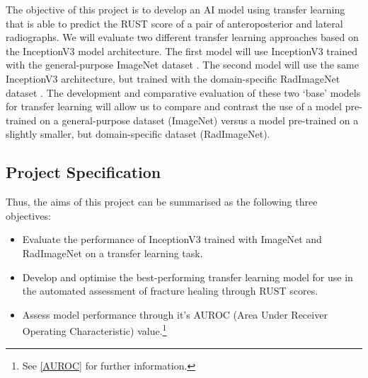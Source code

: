 The objective of this project is to develop an AI model using transfer learning that is able to predict the RUST score of a pair of anteroposterior and lateral radiographs. We will evaluate two different transfer learning approaches based on the InceptionV3 model architecture\autocite{inceptionv3}.
The first model will use InceptionV3 trained with the general-purpose ImageNet dataset \autocite{imagenet}.
The second model will use the same InceptionV3 architecture, but trained with the domain-specific RadImageNet dataset \autocite{radimagenet}. The development and comparative evaluation of these two \enquote*{base} models for transfer learning will allow us to compare and contrast the use of a model pre-trained on a general-purpose dataset (ImageNet) versus a model pre-trained on a slightly smaller, but domain-specific dataset (RadImageNet).

\clearpage
\subsection{Project Specification}

Thus, the aims of this project can be summarised as the following three objectives:

\begin{itemize}
    \item Evaluate the performance of InceptionV3 trained with ImageNet and RadImageNet on a transfer learning task.
    \item Develop and optimise the best-performing transfer learning model for use in the automated assessment of fracture healing through RUST scores.
    \item Assess model performance through it's AUROC (Area Under Receiver Operating Characteristic) value.\footnote{See \ref{AUROC} for further information.}
\end{itemize}

